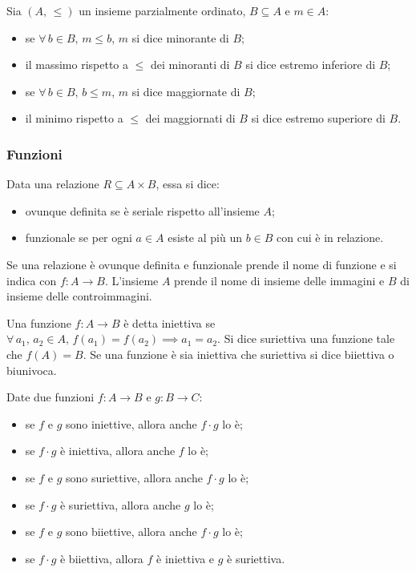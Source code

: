 \documentclass[10pt]{article}
\begin{document}
                Sia \((A, \, \leqslant)\) un insieme parzialmente ordinato, \(B \subseteq A\) e \(m \in A\):
                \begin{itemize}
                    \item se \(\forall \, b \in B, \, m \leqslant b\), \(m\) si dice minorante di \(B\);
                    \item il massimo rispetto a \(\leqslant\) dei minoranti di \(B\) si dice estremo inferiore di \(B\);
                    \item se \(\forall \, b \in B, \, b \leqslant m\), \(m\) si dice maggiornate di \(B\);
                    \item il minimo rispetto a \(\leqslant\) dei maggiornati di \(B\) si dice estremo superiore di \(B\).
                \end{itemize}

            \subsubsection*{Funzioni}

                Data una relazione \(R \subseteq A \times B\), essa si dice:
                \begin{itemize}
                    \item ovunque definita se è seriale rispetto all'insieme \(A\);
                    \item funzionale se per ogni \(a \in A\) esiste al più un \(b \in B\) con cui è in relazione.
                \end{itemize}
                Se una relazione è ovunque definita e funzionale prende il nome di funzione e si indica con \(f : A \to B\). L'insieme
                \(A\) prende il nome di insieme delle immagini e \(B\) di insieme delle controimmagini.

                Una funzione \(f : A \to B\) è detta iniettiva se \(\forall \, a_1, \, a_2 \in A, \, f(a_1) = f(a_2)\implies a_1 = a_2\).
                Si dice suriettiva una funzione tale che \(f(A) = B\). Se una funzione è sia iniettiva che suriettiva si dice biiettiva
                o biunivoca.

                Date due funzioni \(f : A \to B\) e \(g : B \to C\):
                \begin{itemize}
                    \item se \(f\) e \(g\) sono iniettive, allora anche \(f \cdot g\) lo è;
                    \item se \(f \cdot g\) è iniettiva, allora anche \(f\) lo è;
                    \item se \(f\) e \(g\) sono suriettive, allora anche \(f \cdot g\) lo è;
                    \item se \(f \cdot g\) è suriettiva, allora anche \(g\) lo è;
                    \item se \(f\) e \(g\) sono biiettive, allora anche \(f \cdot g\) lo è;
                    \item se \(f \cdot g\) è biiettiva, allora \(f\) è iniettiva e \(g\) è suriettiva.
                \end{itemize}
\end{document}
